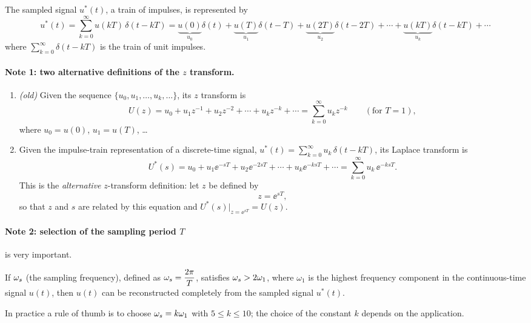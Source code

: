 The sampled signal $u^{*}(t)$, a train of impulses, is represented by
\begin{equation}
  u^{*}(t)=\sum_{k=0}^{\infty}u(kT)\,\delta(t-kT)
  =\underbrace{u(0)}_{u_0}\delta(t)+\underbrace{u(T)}_{u_1}\delta(t-T)+\underbrace{u(2T)}_{u_2}\delta(t-2T)
  +\cdots+\underbrace{u(kT)}_{u_k}\delta(t-kT)+\cdots
\end{equation}
where $\sum_{k=0}^{\infty}\delta(t-kT)$ is the train of unit impulses.

\paragraph{Note 1: two alternative definitions of the $z$ transform.}
\begin{enumerate}
  \item[(1)] \emph{(old)} Given the sequence $\{u_0,u_1,\dots,u_k,\dots\}$, its $z$ transform is
  \begin{equation}
    U(z)=u_0+u_1z^{-1}+u_2z^{-2}+\cdots+u_kz^{-k}+\cdots=\sum_{k=0}^{\infty}u_kz^{-k}\qquad(\text{for }T=1),
  \end{equation}
  where $u_0=u(0)$, $u_1=u(T)$, \dots
  \item[(2)] Given the impulse-train representation of a discrete-time signal,
  $u^{*}(t)=\sum_{k=0}^{\infty}u_k\,\delta(t-kT)$, its Laplace transform is
  \begin{equation}
    U^{*}(s)=u_0+u_1\ee^{-sT}+u_2\ee^{-2sT}+\cdots+u_k\ee^{-ksT}+\cdots=\sum_{k=0}^{\infty}u_k\,\ee^{-ksT}.
  \end{equation}
  This is the \emph{alternative} $z$-transform definition: let $z$ be defined by
  \begin{equation}\label{eq:zes}
    z=\ee^{sT},
  \end{equation}
  so that $z$ and $s$ are related by this equation and $U^{*}(s)\big|_{z=\ee^{sT}}=U(z)$.
\end{enumerate}

\paragraph{Note 2: selection of the sampling period $T$} is very important.
\begin{theorem}
If $\omega_s$ (the sampling frequency), defined as $\omega_s=\dfrac{2\pi}{T}$, satisfies $\omega_s>2\omega_1$, where
$\omega_1$ is the highest frequency component in the continuous-time signal $u(t)$, then $u(t)$ can be
reconstructed completely from the sampled signal $u^{*}(t)$.
\end{theorem}
In practice a rule of thumb is to choose $\omega_s=k\omega_1$ with $5\le k\le10$; the choice of the
constant $k$ depends on the application.

